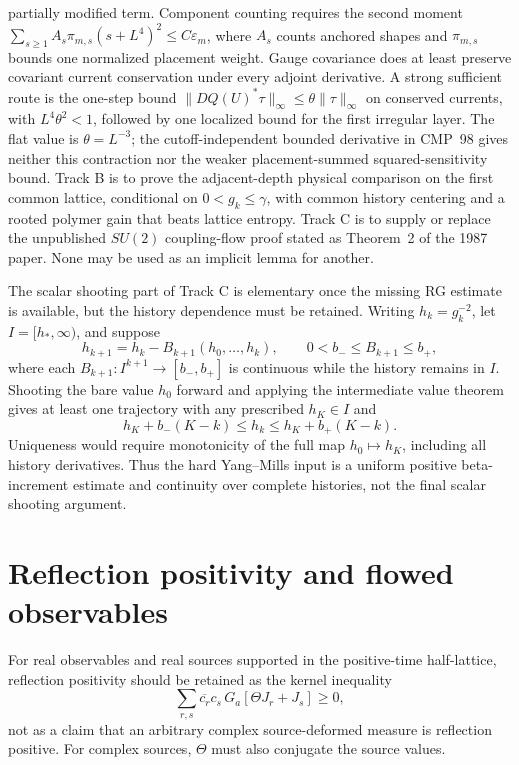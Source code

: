 \documentclass[11pt]{article}
\theoremstyle{definition}
\theoremstyle{remark}
\begin{document}
partially modified term.  Component counting requires the second moment
$\sum_{s\ge1}A_s\pi_{m,s}(s+L^4)^2\le C\varepsilon_m$, where $A_s$ counts
anchored shapes and $\pi_{m,s}$ bounds one normalized placement weight.
Gauge covariance does at least preserve covariant current conservation under
every adjoint derivative.  A strong sufficient route is the one-step bound
$\|DQ(U)^*\tau\|_\infty\le\theta\|\tau\|_\infty$ on conserved currents,
with $L^4\theta^2<1$, followed by one localized bound for the first irregular
layer.  The flat value is $\theta=L^{-3}$; the cutoff-independent bounded
derivative in CMP~98 gives neither this contraction nor the weaker
placement-summed squared-sensitivity bound.
Track B is to prove the adjacent-depth
physical comparison on the first common lattice, conditional on
$0<g_k\le\gamma$, with common history centering and a rooted polymer gain that
beats lattice entropy.  Track C is to supply or replace the unpublished $SU(2)$
coupling-flow proof stated as Theorem~2 of the 1987 paper.  None may be used as
an implicit lemma for another.

The scalar shooting part of Track C is elementary once the missing RG estimate
is available, but the history dependence must be retained.  Writing
$h_k=g_k^{-2}$, let $I=[h_*,\infty)$, and suppose
\[
 h_{k+1}=h_k-B_{k+1}(h_0,\ldots,h_k),
 \qquad 0<b_-\le B_{k+1}\le b_+,
\]
where each $B_{k+1}:I^{k+1}\to[b_-,b_+]$ is continuous while the history
remains in $I$.  Shooting the bare
value $h_0$ forward and applying the intermediate value theorem gives at least
one trajectory with any prescribed $h_K\in I$ and
\[
 h_K+b_-(K-k)\le h_k\le h_K+b_+(K-k).
\]
Uniqueness would require monotonicity of the full map $h_0\mapsto h_K$, including
all history derivatives.  Thus the hard Yang--Mills input is a uniform positive
beta-increment estimate and continuity over complete histories, not the final
scalar shooting argument.

\section{Reflection positivity and flowed observables}

For real observables and real sources supported in the positive-time
half-lattice, reflection positivity should be retained as the kernel inequality
\[
 \sum_{r,s}\overline{c_r}c_s\,G_a[\Theta J_r+J_s]\ge0,
\]
not as a claim that an arbitrary complex source-deformed measure is reflection
positive.  For complex sources, $\Theta$ must also conjugate the source values.
\end{document}
